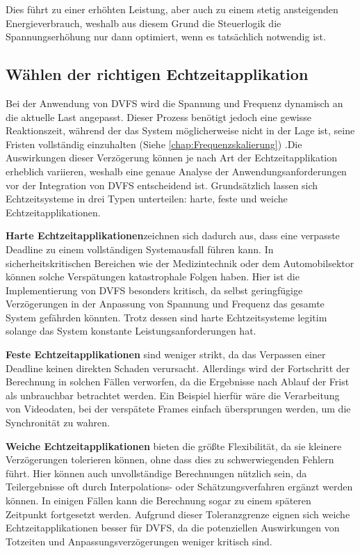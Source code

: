 \documentclass[footmark=none]{tubaf-thesis}
\begin{document}
    		 Dies führt zu einer erhöhten Leistung, aber auch zu einem stetig ansteigenden Energieverbrauch, weshalb aus diesem Grund die Steuerlogik die Spannungserhöhung nur dann optimiert, wenn es tatsächlich notwendig ist.
    		\subsection{Wählen der richtigen Echtzeitapplikation}
    			Bei der Anwendung von DVFS wird die Spannung und Frequenz dynamisch an die aktuelle Last angepasst. Dieser Prozess benötigt jedoch eine gewisse Reaktionszeit, während der das System möglicherweise nicht in der Lage ist, seine Fristen vollständig einzuhalten (Siehe \autoref{chap:Frequenzskalierung}) .Die Auswirkungen dieser Verzögerung können je nach Art der Echtzeitapplikation erheblich variieren, weshalb eine genaue Analyse der Anwendungsanforderungen vor der Integration von DVFS entscheidend ist. Grundsätzlich lassen sich Echtzeitsysteme in drei Typen unterteilen: harte, feste und weiche Echtzeitapplikationen.
    			
    			\textbf{Harte Echtzeitapplikationen}zeichnen sich dadurch aus, dass eine verpasste Deadline zu einem vollständigen Systemausfall führen kann. In sicherheitskritischen Bereichen wie der Medizintechnik oder dem Automobilsektor können solche Verspätungen katastrophale Folgen haben. Hier ist die Implementierung von DVFS besonders kritisch, da selbst geringfügige Verzögerungen in der Anpassung von Spannung und Frequenz das gesamte System gefährden könnten. Trotz dessen sind harte Echtzeitsysteme legitim solange das System konstante Leistungsanforderungen hat. \cite{scholz2005softwareentwicklung}
    			
    			\textbf{Feste Echtzeitapplikationen} sind weniger strikt, da das Verpassen einer Deadline keinen direkten Schaden verursacht. Allerdings wird der Fortschritt der Berechnung in solchen Fällen verworfen, da die Ergebnisse nach Ablauf der Frist als unbrauchbar betrachtet werden. Ein Beispiel hierfür wäre die Verarbeitung von Videodaten, bei der verspätete Frames einfach übersprungen werden, um die Synchronität zu wahren. \cite{scholz2005softwareentwicklung}
    			
    			\textbf{Weiche Echtzeitapplikationen} bieten die größte Flexibilität, da sie kleinere Verzögerungen tolerieren können, ohne dass dies zu schwerwiegenden Fehlern führt. Hier können auch unvollständige Berechnungen nützlich sein, da Teilergebnisse oft durch Interpolations- oder Schätzungsverfahren ergänzt werden können. In einigen Fällen kann die Berechnung sogar zu einem späteren Zeitpunkt fortgesetzt werden. Aufgrund dieser Toleranzgrenze eignen sich weiche Echtzeitapplikationen besser für DVFS, da die potenziellen Auswirkungen von Totzeiten und Anpassungsverzögerungen weniger kritisch sind. \cite{scholz2005softwareentwicklung}
    			
\end{document}
